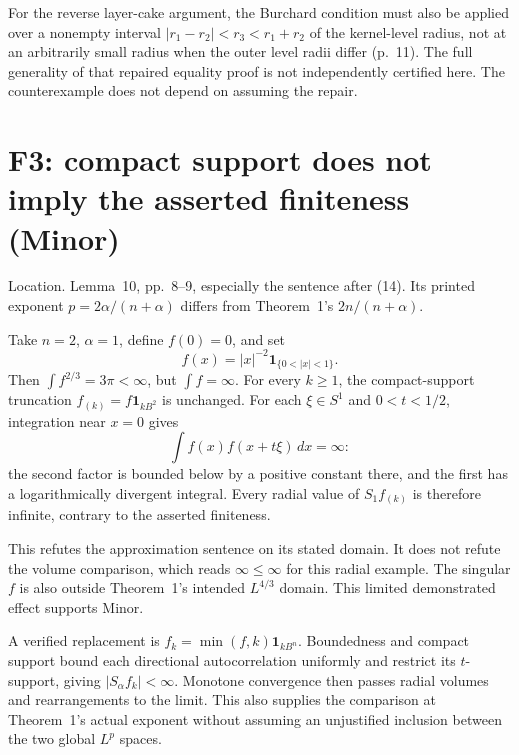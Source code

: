 \documentclass[10pt]{article}
\begin{document}
For the reverse layer-cake argument, the Burchard condition must also be applied over a nonempty interval \(|r_1-r_2|<r_3<r_1+r_2\) of the kernel-level radius, not at an arbitrarily small radius when the outer level radii differ (p. 11). The full generality of that repaired equality proof is not independently certified here. The counterexample does not depend on assuming the repair.\par
\section*{F3: compact support does not imply the asserted finiteness (Minor)}
Location. Lemma 10, pp. 8–9, especially the sentence after (14). Its printed exponent \(p=2\alpha/(n+\alpha)\) differs from Theorem 1’s \(2n/(n+\alpha)\).\par
Take \(n=2\), \(\alpha=1\), define \(f(0)=0\), and set \[f(x)=|x|^{-2}\mathbf 1_{\{0<|x|<1\}}.\] Then \(\int f^{2/3}=3\pi<\infty\), but \(\int f=\infty\). For every \(k\ge1\), the compact-support truncation \(f_{(k)}=f\mathbf 1_{kB^2}\) is unchanged. For each \(\xi\in S^1\) and \(0<t<1/2\), integration near \(x=0\) gives \[\int f(x)f(x+t\xi)\,dx=\infty:\] the second factor is bounded below by a positive constant there, and the first has a logarithmically divergent integral. Every radial value of \(S_1f_{(k)}\) is therefore infinite, contrary to the asserted finiteness.\par
This refutes the approximation sentence on its stated domain. It does not refute the volume comparison, which reads \(\infty\le\infty\) for this radial example. The singular \(f\) is also outside Theorem 1’s intended \(L^{4/3}\) domain. This limited demonstrated effect supports Minor.\par
A verified replacement is \(f_k=\min(f,k)\mathbf 1_{kB^n}\). Boundedness and compact support bound each directional autocorrelation uniformly and restrict its \(t\)-support, giving \(|S_\alpha f_k|<\infty\). Monotone convergence then passes radial volumes and rearrangements to the limit. This also supplies the comparison at Theorem 1’s actual exponent without assuming an unjustified inclusion between the two global \(L^p\) spaces.\par
\end{document}
